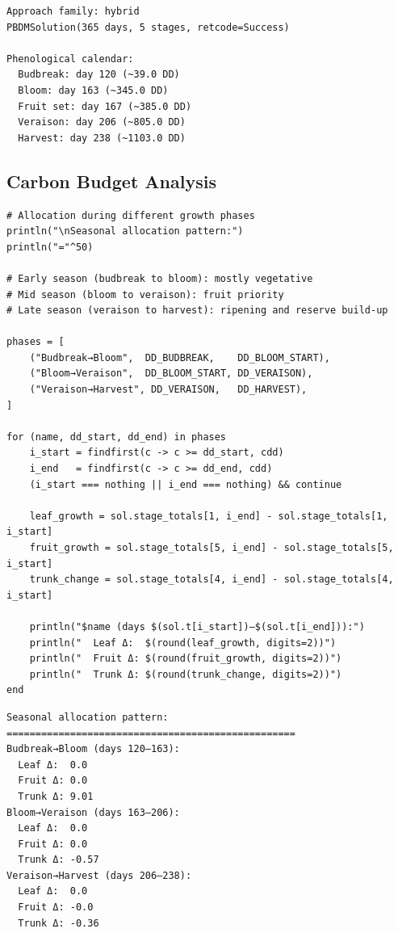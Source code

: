 \begin{verbatim}
Approach family: hybrid
PBDMSolution(365 days, 5 stages, retcode=Success)

Phenological calendar:
  Budbreak: day 120 (~39.0 DD)
  Bloom: day 163 (~345.0 DD)
  Fruit set: day 167 (~385.0 DD)
  Veraison: day 206 (~805.0 DD)
  Harvest: day 238 (~1103.0 DD)
\end{verbatim}



\subsection{Carbon Budget Analysis}



\label{12110121196752394895}{}



\begin{verbatim}
# Allocation during different growth phases
println("\nSeasonal allocation pattern:")
println("="^50)

# Early season (budbreak to bloom): mostly vegetative
# Mid season (bloom to veraison): fruit priority
# Late season (veraison to harvest): ripening and reserve build-up

phases = [
    ("Budbreak→Bloom",  DD_BUDBREAK,    DD_BLOOM_START),
    ("Bloom→Veraison",  DD_BLOOM_START, DD_VERAISON),
    ("Veraison→Harvest", DD_VERAISON,   DD_HARVEST),
]

for (name, dd_start, dd_end) in phases
    i_start = findfirst(c -> c >= dd_start, cdd)
    i_end   = findfirst(c -> c >= dd_end, cdd)
    (i_start === nothing || i_end === nothing) && continue

    leaf_growth = sol.stage_totals[1, i_end] - sol.stage_totals[1, i_start]
    fruit_growth = sol.stage_totals[5, i_end] - sol.stage_totals[5, i_start]
    trunk_change = sol.stage_totals[4, i_end] - sol.stage_totals[4, i_start]

    println("$name (days $(sol.t[i_start])–$(sol.t[i_end])):")
    println("  Leaf Δ:  $(round(leaf_growth, digits=2))")
    println("  Fruit Δ: $(round(fruit_growth, digits=2))")
    println("  Trunk Δ: $(round(trunk_change, digits=2))")
end
\end{verbatim}




\begin{verbatim}
Seasonal allocation pattern:
==================================================
Budbreak→Bloom (days 120–163):
  Leaf Δ:  0.0
  Fruit Δ: 0.0
  Trunk Δ: 9.01
Bloom→Veraison (days 163–206):
  Leaf Δ:  0.0
  Fruit Δ: 0.0
  Trunk Δ: -0.57
Veraison→Harvest (days 206–238):
  Leaf Δ:  0.0
  Fruit Δ: -0.0
  Trunk Δ: -0.36
\end{verbatim}




